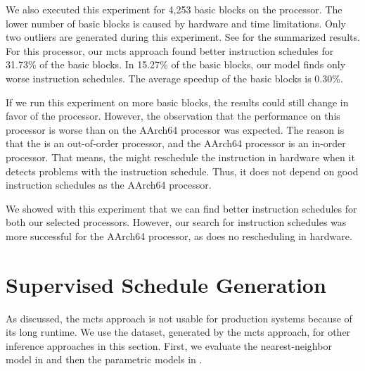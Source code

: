We also executed this experiment for 4,253 basic blocks on the \aurora{} processor.
The lower number of basic blocks is caused by hardware and time limitations.
Only two outliers are generated during this experiment.
See  for the summarized results.
For this processor, our \ac{mcts} approach found better instruction schedules for 31.73\% of the basic blocks.
In 15.27\% of the basic blocks, our model finds only worse instruction schedules.
The average speedup of the basic blocks is 0.30\%.

If we run this experiment on more basic blocks, the results could still change in favor of the \aurora{} processor.
However, the observation that the performance on this processor is worse than on the AArch64 processor was expected.
The reason is that the \aurora{} is an out-of-order processor, and the AArch64 processor is an in-order processor.
That means, the \aurora{} might reschedule the instruction in hardware when it detects problems with the instruction schedule.
Thus, it does not depend on good instruction schedules as the AArch64 processor.

We showed with this experiment that we can find better instruction schedules for both our selected processors.
However, our search for instruction schedules was more successful for the AArch64 processor, as does no rescheduling in hardware.

\section{Supervised Schedule Generation}
\label{sec:eval:supervised}
As discussed, the \ac{mcts} approach is not usable for production systems because of its long runtime.
We use the dataset, generated by the \ac{mcts} approach, for other inference approaches in this section.
First, we evaluate the nearest-neighbor model in  and then the parametric models in .

